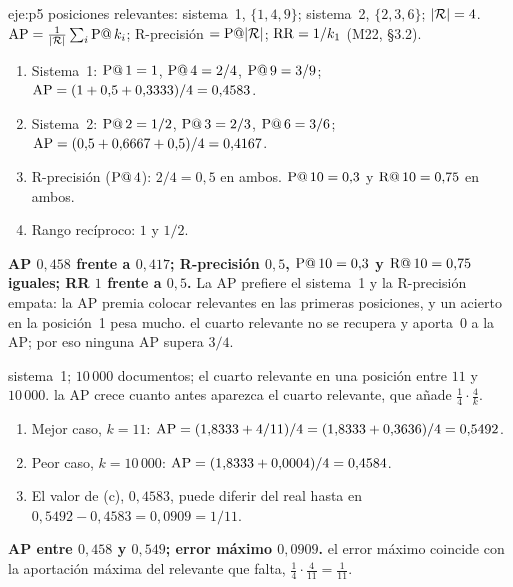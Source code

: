 \begin{solucion}{eje:p5}
\datos posiciones relevantes: sistema~1, $\{1,4,9\}$; sistema~2, $\{2,3,6\}$; $\lvert\mathcal{R}\rvert=4$.
\planteamiento $\operatorname{AP}=\frac{1}{\lvert\mathcal{R}\rvert}\sum_i\operatorname{P@}k_i$; R-precisión $=\operatorname{P@}\lvert\mathcal{R}\rvert$; $\operatorname{RR}=1/k_1$ (M22, §3.2).
\pasos
\begin{enumerate}[label=\arabic*.]
  \item Sistema~1: $\operatorname{P@}1=1$, $\operatorname{P@}4=2/4$, $\operatorname{P@}9=3/9$; $\operatorname{AP}=(1+0{,}5+0{,}3333)/4=0{,}4583$.
  \item Sistema~2: $\operatorname{P@}2=1/2$, $\operatorname{P@}3=2/3$, $\operatorname{P@}6=3/6$; $\operatorname{AP}=(0{,}5+0{,}6667+0{,}5)/4=0{,}4167$.
  \item R-precisión ($\operatorname{P@}4$): $2/4=0{,}5$ en ambos. $\operatorname{P@}10=0{,}3$ y $\operatorname{R@}10=0{,}75$ en ambos.
  \item Rango recíproco: $1$ y $1/2$.
\end{enumerate}
\resultado \textbf{AP $0{,}458$ frente a $0{,}417$; R-precisión $0{,}5$, $\operatorname{P@}10=0{,}3$ y $\operatorname{R@}10=0{,}75$ iguales; RR $1$ frente a $0{,}5$.} La AP prefiere el sistema~1 y la R-precisión empata: la AP premia colocar relevantes en las primeras posiciones, y un acierto en la posición~1 pesa mucho.
\comprobacion el cuarto relevante no se recupera y aporta~0 a la AP; por eso ninguna AP supera $3/4$.

\datos sistema~1; $10\,000$ documentos; el cuarto relevante en una posición entre $11$ y $10\,000$.
\planteamiento la AP crece cuanto antes aparezca el cuarto relevante, que añade $\frac14\cdot\frac{4}{k}$.
\pasos
\begin{enumerate}[label=\arabic*.]
  \item Mejor caso, $k=11$: $\operatorname{AP}=(1{,}8333+4/11)/4=(1{,}8333+0{,}3636)/4=0{,}5492$.
  \item Peor caso, $k=10\,000$: $\operatorname{AP}=(1{,}8333+0{,}0004)/4=0{,}4584$.
  \item El valor de (c), $0{,}4583$, puede diferir del real hasta en $0{,}5492-0{,}4583=0{,}0909=1/11$.
\end{enumerate}
\resultado \textbf{AP entre $0{,}458$ y $0{,}549$; error máximo $0{,}0909$.}
\comprobacion el error máximo coincide con la aportación máxima del relevante que falta, $\frac14\cdot\frac{4}{11}=\frac{1}{11}$.
\end{solucion}

